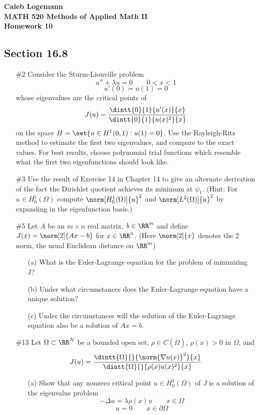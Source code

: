 \documentclass[11pt, oneside]{article}
\begin{document}
\noindent \textbf{\Large{Caleb Logemann \\
MATH 520 Methods of Applied Math II \\
Homework 10
}}

\subsection*{Section 16.8}
\begin{enumerate}
  \item[\#2]
    Consider the Sturm-Liouville problem
    \[
      u'' + \lambda u = 0 \qquad 0 < x < 1
    \]
    \[
      u'(0) = u(1) = 0
    \]
    whose eigenvalues are the critical points of
    \[
      J(u) = \frac{\dintt{0}{1}{u'(x)}{x}}{\dintt{0}{1}{u(x)^2}{x}}
    \]
    on the space $H = \set{u \in H^1(0, 1): u(1) = 0}$.
    Use the Rayleigh-Ritz method to estimate the first two eigenvalues, and
    compare to the exact values.
    For best results, choose polynomial trial functions which resemble what the
    first two eigenfunctions should look like.

  \item[\#3]
    Use the result of Exercise 14 in Chapter 14 to give an alternate derivation
    of the fact the Dirichlet quotient achieves its minimum at $\psi_1$.
    (Hint: For $u \in H_0^1(\Omega)$ compute $\norm[H_0^1(\Omega)]{u}^2$ and
    $\norm[L^2(\Omega)]{u}^2$ by expanding in the eigenfunction basis.)

  \item[\#5]
    Let $A$ be an $m \times n$ real matrix, $b \in \RR^m$ and define
    $J(x) = \norm[2]{Ax - b}$ for $x \in \RR^n$.
    (Here $\norm[2]{x}$ denotes the 2 norm, the usual Euclidean distance on
    $\RR^m$)
    \begin{enumerate}
      \item[(a)]
        What is the Euler-Lagrange equation for the problem of minimizing J?

      \item[(b)]
        Under what circumstances does the Euler-Lagrange equation have a unique
        solution?

      \item[(c)]
        Under the circumstances will the solution of the Euler-Lagrange equation
        also be a solution of $Ax = b$.
    \end{enumerate}

  \item[\#13]
    Let $\Omega \subset \RR^N$ be a bounded open set,
    $\rho \in C(\overline{\Omega})$, $\rho(x) > 0$ in $\Omega$, and
    \[
      J(u) = \frac{\dintt{\Omega}{}{\norm{\nabla u(x)}^2}{x}}{\dintt{\Omega}{}{\rho(x)u(x)^2}{x}}
    \]
    \begin{enumerate}
      \item[(a)]
        Show that any nonzero critical point $u \in H_0^1(\Omega)$ of $J$ is a
        solution of the eigenvalue problem
        \[
          -\Delta u = \lambda \rho(x) u \qquad x \in \Omega
        \]
        \[
          u = 0 \qquad x \in \partial \Omega
        \]


\end{enumerate}
\end{enumerate}
\end{document}
